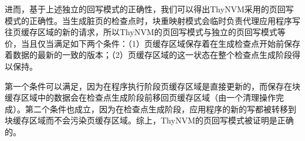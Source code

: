 进而，基于上述独立的回写模式的正确性，我们可以得出ThyNVM采用的页回写模式的正确性。当生成脏页的检查点时，块重映射模式会临时负责代理应用程序写往页缓存区域的新的请求，所以ThyNVM的页回写模式与独立的页回写模式等价，当且仅当满足如下两个条件：（1）页缓存区域保存着在生成检查点开始前保存着数据的最新的一致的版本；（2）页缓存区域的这一状态在整个检查点生成阶段得以保持。

第一个条件可以满足，因为在程序执行阶段页缓存区域是直接更新的，而保存在块缓存区域中的数据会在检查点生成阶段前移回页缓存区域（由一个清理操作完成）。第二个条件也成立，因为在检查点生成阶段，应用程序的新的写都被转移到块缓存区域而不会污染页缓存区域。综上，ThyNVM的页回写模式被证明是正确的。
